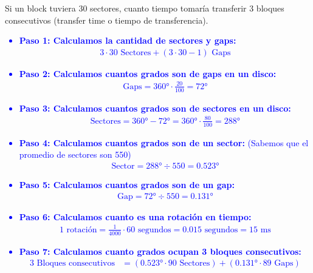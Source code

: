\documentclass{templateNote}
\begin{document}
\begin{enumerate}
    Si un block tuviera 30 sectores, cuanto tiempo tomaría transferir 3 bloques consecutivos (transfer time o tiempo de transferencia).
    \textcolor{blue}{
        \begin{itemize}
            \item \textbf{Paso 1: Calculamos la cantidad de sectores y gaps:}
            \begin{align*}
                3 \cdot 30 \text{ Sectores} + (3 \cdot 30 - 1) \text{ Gaps}
            \end{align*}
            \item \textbf{Paso 2: Calculamos cuantos grados son de gaps en un disco:}
            \begin{align*}
                \text{Gaps} = 360\text{°} \cdot \frac{20}{100} = 72\text{°}
            \end{align*}
            \item \textbf{Paso 3: Calculamos cuantos grados son de sectores en un disco:}
            \begin{align*}
                \text{Sectores} = 360\text{°} - 72\text{°} = 360\text{°} \cdot \frac{80}{100} = 288\text{°}
            \end{align*}
            \item \textbf{Paso 4: Calculamos cuantos grados son de un sector:} (Sabemos que el promedio de sectores son 550)
            \begin{align*}
                \text{Sector} = 288\text{°} \div 550 = 0.523\text{°}
            \end{align*}
            \item \textbf{Paso 5: Calculamos cuantos grados son de un gap:}
            \begin{align*}
                \text{Gap} = 72\text{°} \div 550 = 0.131\text{°}
            \end{align*}
            \item \textbf{Paso 6: Calculamos cuanto es una rotación en tiempo:}
            \begin{align*}
                1 \text{ rotación} = \frac{1}{4000} \cdot 60 \text{ segundos} = 0.015 \text{ segundos} = 15 \text{ ms}
            \end{align*}
            \item \textbf{Paso 7: Calculamos cuanto grados ocupan 3 bloques consecutivos:}
            \begin{align*}
                \text{3 Bloques consecutivos} &= (0.523\text{°} \cdot 90 \text{ Sectores}) + (0.131\text{°} \cdot 89 \text{ Gaps}) \\

\end{align*}
\end{itemize}}
\end{enumerate}
\end{document}
